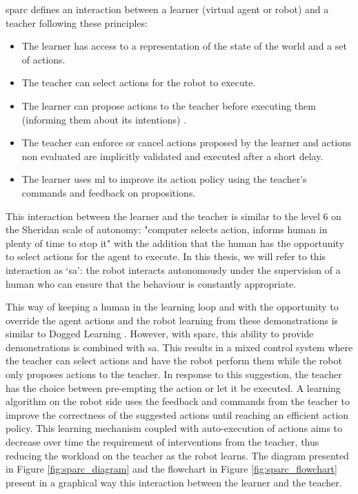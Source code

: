 \gls{sparc} defines an interaction between a learner (virtual agent or robot) and a teacher following these principles:
\begin{itemize}
	\item The learner has access to a representation of the state of the world and a set of actions.
	\item The teacher can select actions for the robot to execute.
	\item The learner can propose actions to the teacher before executing them (informing them about its intentions) .
	\item The teacher can enforce or cancel actions proposed by the learner and actions non evaluated are implicitly validated and executed after a short delay.
	\item The learner uses \gls{ml} to improve its action policy using the teacher's commands and feedback on propositions.
\end{itemize} 

This interaction between the learner and the teacher is similar to the level 6 on the Sheridan scale of autonomy: "computer selects action, informs human in plenty of time to stop it" \citep{sheridan1978human} with the addition that the human has the opportunity to select actions for the agent to execute. In this thesis, we will refer to this interaction as `\gls{sa}': the robot interacts autonomously under the supervision of a human who can ensure that the behaviour is constantly appropriate.

This way of keeping a human in the learning loop and with the opportunity to override the agent actions and the robot learning from these demonstrations is similar to Dogged Learning \citep{grollman2007dogged}. However, with \gls{sparc}, this ability to provide demonstrations is combined with \gls{sa}. This results in a mixed control system where the teacher can select actions and have the robot perform them while the robot only proposes actions to the teacher. In response to this suggestion, the teacher has the choice between pre-empting the action or let it be executed. A learning algorithm on the robot side uses the feedback and commands from the teacher to improve the correctness of the suggested actions until reaching an efficient action policy. This learning mechanism coupled with auto-execution of actions aims to decrease over time the requirement of interventions from the teacher, thus reducing the workload on the teacher as the robot learns. The diagram presented in Figure \ref{fig:sparc_diagram} and the flowchart in Figure \ref{fig:sparc_flowchart} present in a graphical way this interaction between the learner and the teacher.

